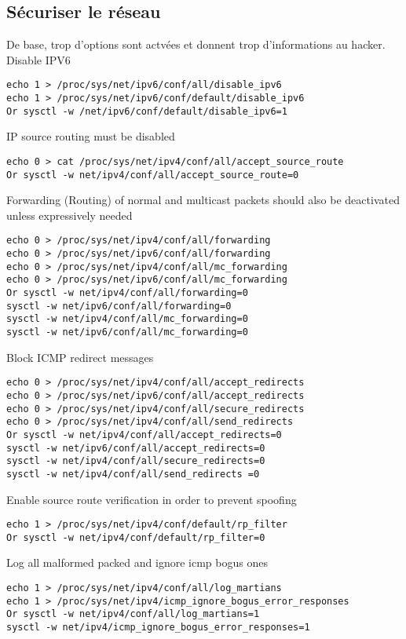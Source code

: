 \subsection{Sécuriser le réseau}
De base, trop d'options sont actvées et donnent trop d'informations au hacker. \\
Disable IPV6
\begin{lstlisting}[style=bash]
echo 1 > /proc/sys/net/ipv6/conf/all/disable_ipv6
echo 1 > /proc/sys/net/ipv6/conf/default/disable_ipv6
Or sysctl -w /net/ipv6/conf/default/disable_ipv6=1
\end{lstlisting}
IP source routing must be disabled
\begin{lstlisting}[style=bash]
echo 0 > cat /proc/sys/net/ipv4/conf/all/accept_source_route
Or sysctl -w net/ipv4/conf/all/accept_source_route=0
\end{lstlisting}
Forwarding (Routing) of normal and multicast packets should also be deactivated unless 
expressively needed
\begin{lstlisting}[style=bash]
echo 0 > /proc/sys/net/ipv4/conf/all/forwarding
echo 0 > /proc/sys/net/ipv6/conf/all/forwarding
echo 0 > /proc/sys/net/ipv4/conf/all/mc_forwarding
echo 0 > /proc/sys/net/ipv6/conf/all/mc_forwarding
Or sysctl -w net/ipv4/conf/all/forwarding=0
sysctl -w net/ipv6/conf/all/forwarding=0
sysctl -w net/ipv4/conf/all/mc_forwarding=0
sysctl -w net/ipv6/conf/all/mc_forwarding=0
\end{lstlisting}
Block ICMP redirect messages
\begin{lstlisting}[style=bash]
echo 0 > /proc/sys/net/ipv4/conf/all/accept_redirects
echo 0 > /proc/sys/net/ipv6/conf/all/accept_redirects
echo 0 > /proc/sys/net/ipv4/conf/all/secure_redirects
echo 0 > /proc/sys/net/ipv4/conf/all/send_redirects
Or sysctl -w net/ipv4/conf/all/accept_redirects=0
sysctl -w net/ipv6/conf/all/accept_redirects=0
sysctl -w net/ipv4/conf/all/secure_redirects=0
sysctl -w net/ipv4/conf/all/send_redirects =0
\end{lstlisting}
Enable source route verification in order to prevent spoofing
\begin{lstlisting}[style=bash]
echo 1 > /proc/sys/net/ipv4/conf/default/rp_filter
Or sysctl -w net/ipv4/conf/default/rp_filter=0
\end{lstlisting}
Log all malformed packed and ignore icmp bogus ones
\begin{lstlisting}[style=bash]
echo 1 > /proc/sys/net/ipv4/conf/all/log_martians
echo 1 > /proc/sys/net/ipv4/icmp_ignore_bogus_error_responses
Or sysctl -w net/ipv4/conf/all/log_martians=1
sysctl -w net/ipv4/icmp_ignore_bogus_error_responses=1
\end{lstlisting}
